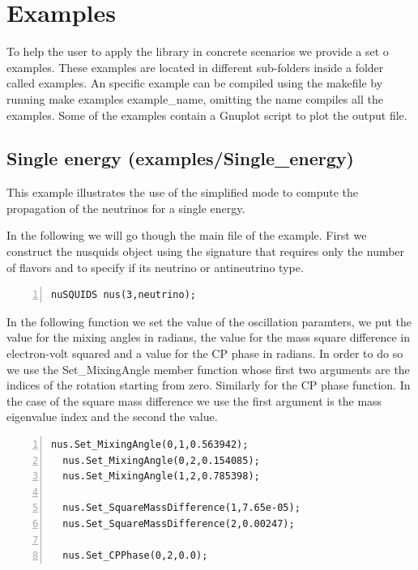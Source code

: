 

\section{Examples}
\label{sec:examples}
To help the user to apply the library in concrete scenarios we provide
a set o examples. These examples are located in different sub-folders inside a folder
called {\ttf examples}. An specific example can be compiled using the
makefile by running {\ttf make examples example\_name}, omitting the
name compiles all the examples. 
Some of the examples contain a {\ttf Gnuplot} script to plot the output file.

\subsection{Single energy \textnormal{({\ttf examples/Single\_energy})}}
\label{sec:single}
This example illustrates the use of the simplified mode to compute the
propagation of the neutrinos for a single energy. 

In the following we will go though the main file of the example.
First we construct the nusquids object using the signature that
requires only the number of flavors and to specify if its
neutrino or antineutrino type.

\begin{lstlisting}[frame=leftline, numbers = left,breaklines=true, label = ex:sin1]
  nuSQUIDS nus(3,neutrino);
\end{lstlisting}

In the following function we set the value of the oscillation paramters, we put
the value for the mixing angles in radians, the value for the mass
square difference in electron-volt squared and a value for the CP
phase in radians.
In order to do so we use the {\ttf Set\_MixingAngle} member function
whose first two arguments are the indices of the rotation  starting
from zero. Similarly for the CP phase function.
In the case of the square mass difference we use the first argument is
the mass eigenvalue index and the second the value.
 
\begin{lstlisting}[frame=leftline, numbers = left,breaklines=true, label = ex:sin1,firstnumber=last]
  nus.Set_MixingAngle(0,1,0.563942);
  nus.Set_MixingAngle(0,2,0.154085);
  nus.Set_MixingAngle(1,2,0.785398);

  nus.Set_SquareMassDifference(1,7.65e-05);
  nus.Set_SquareMassDifference(2,0.00247);

  nus.Set_CPPhase(0,2,0.0);
\end{lstlisting}

